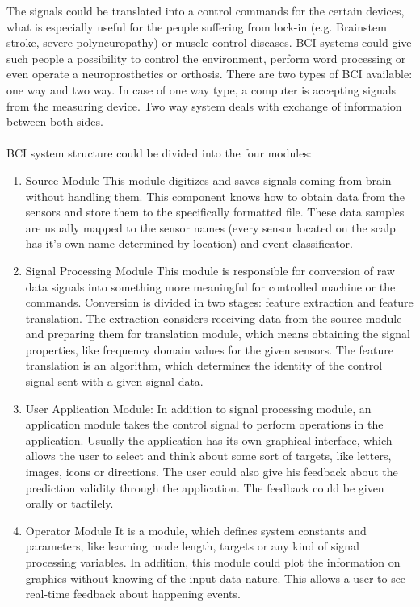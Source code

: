 \documentclass[12pt]{article}
\begin{document}
The signals could be translated into a control commands for the certain devices, what is especially useful for the people suffering from lock-in (e.g. Brainstem stroke, severe polyneuropathy) or muscle control diseases.  BCI systems could give such people a possibility to control the environment, perform word processing or even operate a neuroprosthetics or orthosis.
There are two types of BCI available: one way and two way. In case of one way type, a computer is accepting signals from the measuring device. Two way system deals with exchange of information between both sides.\cite{bci_shivangi}
\paragraph{}
BCI system structure could be divided into the four modules\cite{bci_shivangi}:
\begin{enumerate}
\item Source Module
This module digitizes and saves signals coming from brain without handling them. This component knows how to obtain data from the sensors and store them to the specifically formatted file. These data samples are usually mapped to the sensor names (every sensor located on the scalp has it's own name determined by location) and event classificator. 
\item Signal Processing Module
This module is responsible for conversion of raw data signals into something more meaningful for controlled machine or the commands. Conversion is divided in two stages: feature extraction and feature translation. The extraction considers receiving data from the source module and preparing them for translation module, which means obtaining the signal properties, like frequency domain values for the given sensors. The feature translation is an algorithm, which determines the identity of the control signal sent with a given signal data. 
\item User Application Module:
In addition to signal processing module, an application module takes the control signal to perform operations in the application. Usually the application has its own graphical interface, which allows the user to select and think about some sort of targets, like letters, images, icons or directions. The user could also give his feedback about the prediction validity through the application. The feedback could be given orally or tactilely. 
\item Operator Module
It is a module, which defines system constants and parameters, like learning mode length, targets or any kind of signal processing variables. In addition, this module could plot the information on graphics without knowing of the input data nature. This allows a user to see real-time feedback about happening events.
\end{enumerate}
\end{document}
